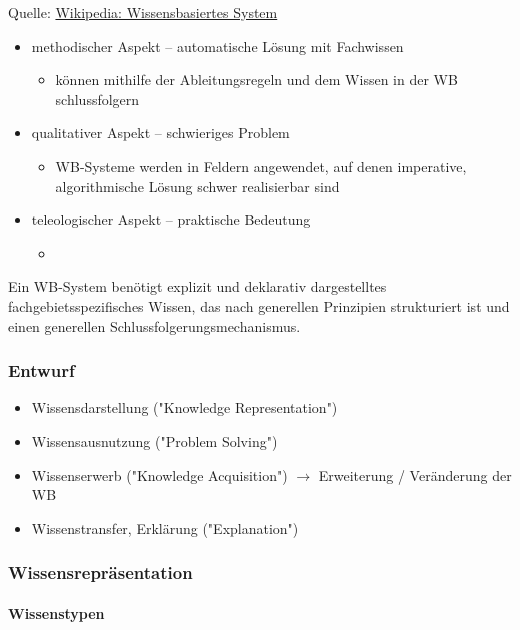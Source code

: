 \documentclass[runningheads]{llncs}
\begin{document}
Quelle: \href{https://de.wikipedia.org/wiki/Wissensbasiertes_System}{Wikipedia: Wissensbasiertes System}

\pagebreak

\begin{itemize}
    \item methodischer Aspekt -- automatische Lösung mit Fachwissen
    \begin{itemize}
        \item können mithilfe der Ableitungsregeln und dem Wissen in der WB schlussfolgern
    \end{itemize}
    \item qualitativer Aspekt -- schwieriges Problem
    \begin{itemize}
        \item WB-Systeme werden in Feldern angewendet, auf denen imperative, algorithmische Lösung schwer realisierbar sind
    \end{itemize}
    \item teleologischer Aspekt -- praktische Bedeutung
    \begin{itemize}
        \item 
    \end{itemize}
\end{itemize}

Ein WB-System benötigt explizit und deklarativ dargestelltes fachgebietsspezifisches Wissen, das nach generellen Prinzipien strukturiert ist und einen generellen Schlussfolgerungsmechanismus.

\subsubsection{Entwurf}
\begin{itemize}
    \item Wissensdarstellung ("Knowledge Representation")
    \item Wissensausnutzung ("Problem Solving")
    \item Wissenserwerb ("Knowledge Acquisition") $\rightarrow$ Erweiterung / Veränderung der WB
    \item Wissenstransfer, Erklärung ("Explanation")
\end{itemize}

\subsubsection{Wissensrepräsentation}
\paragraph{Wissenstypen}
\end{document}
